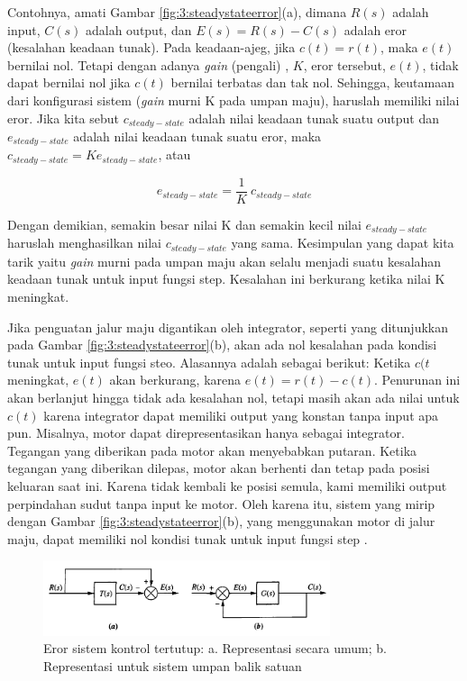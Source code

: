 Contohnya, amati Gambar \ref{fig:3:steadystateerror}(a), dimana $R(s)$ adalah input, $C(s)$ adalah output, dan $E(s) = R(s) - C(s)$ adalah eror (kesalahan keadaan tunak). Pada keadaan-ajeg, jika $c(t) = r(t)$, maka $e(t)$ bernilai nol. Tetapi dengan adanya \textit{gain} (pengali) , $K$, eror tersebut, $e(t)$, tidak dapat bernilai nol jika $c(t)$ bernilai terbatas dan tak nol. Sehingga, keutamaan dari konfigurasi sistem (\textit{gain} murni K pada umpan maju), haruslah memiliki nilai eror. Jika kita sebut $c_{steady-state}$ adalah nilai keadaan tunak suatu output dan $e_{steady-state}$ adalah nilai keadaan tunak suatu eror, maka $c_{steady-state} = K e_{steady-state}$, atau 

\begin{equation} \label{eq:3:steady-state-error}
e_{steady-state} = \frac{1}{K} \ c_{steady-state}
\end{equation}

Dengan demikian, semakin besar nilai K dan semakin kecil nilai $e_{steady-state}$ haruslah menghasilkan nilai $c_{steady-state}$ yang sama. Kesimpulan yang dapat kita tarik yaitu \textit{gain} murni pada umpan maju akan selalu menjadi suatu kesalahan keadaan tunak untuk input fungsi step. Kesalahan ini berkurang ketika nilai K meningkat.

Jika penguatan jalur maju digantikan oleh integrator, seperti yang ditunjukkan pada Gambar \ref{fig:3:steadystateerror}(b), akan ada nol kesalahan pada kondisi tunak untuk input fungsi steo. Alasannya adalah sebagai berikut: Ketika $c(t$ meningkat, $e(t)$ akan berkurang, karena $e(t) = r(t) - c(t)$. Penurunan ini akan berlanjut hingga tidak ada kesalahan nol, tetapi masih akan ada nilai untuk $c(t)$ karena integrator dapat memiliki output yang konstan tanpa input apa pun. Misalnya, motor dapat direpresentasikan hanya sebagai integrator. Tegangan yang diberikan pada motor akan menyebabkan putaran. Ketika tegangan yang diberikan dilepas, motor akan berhenti dan tetap pada posisi keluaran saat ini. Karena tidak kembali ke posisi semula, kami memiliki output perpindahan sudut tanpa input ke motor. Oleh karena itu, sistem yang mirip dengan Gambar \ref{fig:3:steadystateerror}(b), yang menggunakan motor di jalur maju, dapat memiliki nol kondisi tunak untuk input fungsi step \cite{ControlSystem}.

\begin{figure}[!h]
	\centering
	\includegraphics[width=0.75\textwidth]{figures/SSEExample2}
	\caption{Eror sistem kontrol tertutup: a. Representasi secara umum; b. Representasi untuk sistem umpan balik satuan}
	\label{fig:3:steadystateerror2}
\end{figure}

